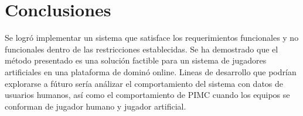 \chapter*{Conclusiones}


\noindent 
Se logró implementar un sistema que satisface los requerimientos funcionales y no 
funcionales dentro de las restricciones establecidas. Se ha demostrado que el método 
presentado es una solución factible para un sistema de jugadores artificiales en una 
plataforma de dominó online. Lineas de desarrollo que podrían explorarse a fúturo sería 
análizar el comportamiento del sistema con datos de usuarios humanos, así como el 
comportamiento de  PIMC cuando los equipos se conforman de jugador humano y jugador 
artificial.
